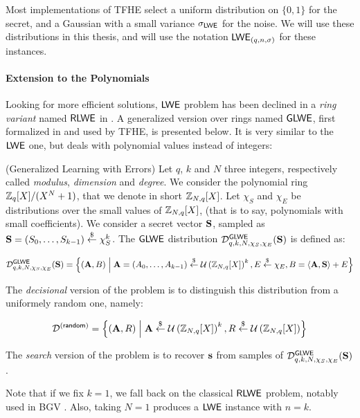Most implementations of TFHE select a uniform distribution on $\{0, 1\}$ for the secret, and a Gaussian with a small variance $\sigma_{\textsf{LWE}}$ for the noise. We will use these distributions in this thesis, and will use the notation $\textsf{LWE}_{(q, n, \sigma)}$ for these instances.



\paragraph{Extension to the Polynomials}


Looking for more efficient solutions, $\textsf{LWE}$ problem has been declined in a \textit{ring variant} named $\textsf{RLWE}$ in \cite{rlwe}. A generalized version over rings named $\textsf{GLWE}$, first formalized in \cite{EPRINT:BraGenVai11} and used by TFHE, is presented below. It is very similar to the $\textsf{LWE}$ one, but deals with polynomial values instead of integers:

\begin{definition}
	(Generalized Learning with Errors) Let $q$, $k$ and $N$ three integers, respectively called \textit{modulus}, \textit{dimension} and \textit{degree}. We consider the polynomial ring $\mathbb{Z}_q[X] / (X^N + 1)$, that we denote in short $\mathbb{Z}_{N,q}[X]$. Let $\chi_S$ and $\chi_E$ be distributions over the small values of $\mathbb{Z}_{N,q}[X]$, (that is to say, polynomials with small coefficients). We consider a secret vector $\mathbf S$, sampled as $\mathbf S = (S_0, \dots, S_{k-1}) \overset{\$}{\leftarrow} \chi_S^k$. The $\textsf{GLWE}$ distribution $\mathcal{D}_{q, k, N, \chi_S, \chi_E}^{\textsf{GLWE}}(\mathbf S)$ is defined as:
	
	\[
	\mathcal{D}_{q, k, N, \chi_S, \chi_E}^{\textsf{GLWE}}(\mathbf S) = \left \{ (\mathbf A, B) \;\middle|\; \mathbf A = (A_0, \dots, A_{k-1}) \overset{\$}{\leftarrow} \mathcal U \left ( \mathbb{Z}_{N,q}[X] \right )^k, E \overset{\$}{\leftarrow} \chi_E, B = \left \langle \mathbf A, \mathbf S \right \rangle + E \right \}
	\]
	
	The \textit{decisional} version of the problem is to distinguish this distribution from a uniformely random one, namely:
	
	\[
	\mathcal{D}^{(\textsf{random})} = \left \{(\mathbf A, R) \;\middle|\; \mathbf A \overset{\$}{\leftarrow} \mathcal U \left ( \mathbb{Z}_{N,q}[X] \right )^k, R \overset{\$}{\leftarrow} \mathcal U \left ( \mathbb{Z}_{N,q}[X] \right ) \right\}
	\]
	
	The \emph{search} version of the problem is to recover $\mathbf s$ from samples of $\mathcal{D}_{q, k , N, \chi_S, \chi_E}^{\textsf{GLWE}}(\mathbf S)$. 
	\label{def:GLWE}
\end{definition}

Note that if we fix $k = 1$, we fall back on the classical $\textsf{RLWE}$ problem, notably used in BGV \cite{bgv}. Also, taking $N=1$ produces a $\textsf{LWE}$ instance with $n = k$. 

